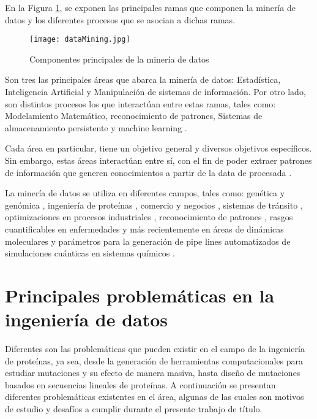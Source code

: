 En la Figura \ref{intro1}, se exponen las principales ramas que componen la minería de datos y los diferentes procesos que se asocian a dichas ramas.

\begin{figure}[!h]
	
	\centering
	\texttt{[image: dataMining.jpg]}
	\caption{Componentes principales de la minería de datos}
	\label{intro1}
\end{figure}

Son tres las principales áreas que abarca la minería de datos: Estadística, Inteligencia Artificial y Manipulación de sistemas de información. Por otro lado, son distintos procesos los que interactúan entre estas ramas, tales como: Modelamiento Matemático, reconocimiento de patrones, Sistemas de almacenamiento persistente y machine learning \cite{hand2006data}.

Cada área en particular, tiene un objetivo general y diversos objetivos específicos. Sin embargo, estas áreas interactúan entre sí, con el fin de poder extraer patrones de información que generen conocimientos a partir de la data de procesada \cite{berry2004data}.

La minería de datos se utiliza en diferentes campos, tales como: genética y genómica \cite{Lee2008, Rebhan1998}, ingeniería de proteínas \cite{han2009research, 4548625, li2008fast}, comercio y negocios \cite{hofmann2013rapidminer}, sistemas de tránsito \cite{Ma2013}, optimizaciones en procesos industriales \cite{Chien2008, 8051033, 983448}, reconocimiento de patrones \cite{jain1988algorithms, fayyad1996data}, rasgos cuantificables en enfermedades \cite{Yoo2012, obenshain2004, LDuan} y más recientemente en áreas de dinámicas moleculares \cite{Chen2017, Yang:2005:GFM:1081870.1081962} y parámetros para la generación de pipe lines automatizados de simulaciones cuánticas en sistemas químicos \cite{MAO2004787, PhysRevLett.91.135503, Ramakrishnan2015}.


\section{Principales problemáticas en la ingeniería de datos}

Diferentes son las problemáticas que pueden existir en el campo de la ingeniería de proteínas, ya sea, desde la generación de herramientas computacionales para estudiar mutaciones y su efecto de manera masiva, hasta diseño de mutaciones basados en secuencias lineales de proteínas. A continuación se presentan diferentes problemáticas existentes en el área, algunas de las cuales son motivos de estudio y desafíos a cumplir durante el presente trabajo de título.


